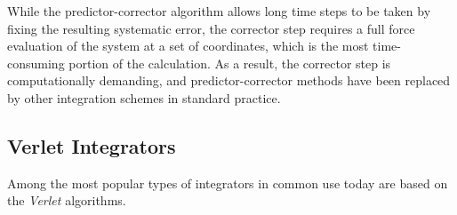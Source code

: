 While the predictor-corrector algorithm allows long time steps to be taken by
fixing the resulting systematic error, the corrector step requires a full force
evaluation of the system at a set of coordinates, which is the most
time-consuming portion of the calculation. As a result, the corrector step is
computationally demanding, and predictor-corrector methods have been replaced by
other integration schemes in standard practice.

\subsection{Verlet Integrators}

Among the most popular types of integrators in common use today are based on the
\emph{Verlet} algorithms.
